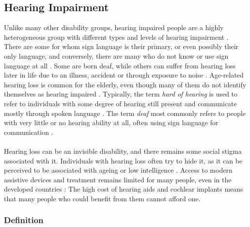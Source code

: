 \documentclass[english, 12pt, a4paper, pdftex, elec, utf8]{aaltothesis}
\begin{document}
\subsection{Hearing Impairment} \label{subsec:hear}

Unlike many other disability groups, hearing impaired people are a highly heterogeneous group with different types and levels of hearing impairment \cite{cavender2008hearing}. There are some for whom sign language is their primary, or even possibly their only language, and conversely, there are many who do not know or use sign language at all \cite{raino2012sisakorvaistutteen}. Some are born deaf, while others can suffer from hearing loss later in life due to an illness, accident or through exposure to noise \cite{moore2007cochlear}. Age-related hearing loss is common for the elderly, even though many of them do not identify themselves as hearing impaired \cite{salonen2013hearing}. Typically, the term \textit{hard of hearing} is used to refer to individuals with some degree of hearing still present and communicate mostly through spoken language \cite{deafness}. The term \textit{deaf} most commonly refers to people with very little or no hearing ability at all, often using sign language for communication \cite{deafness}. \\\\
Hearing loss can be an invisible disability, and there remains some social stigma associated with it. Individuals with hearing loss often try to hide it, as it can be perceived to be associated with ageing or low intelligence \cite{wilson2017global, salonen2013hearing}. Access to modern assistive devices and treatment remains limited for many people, even in the developed countries \cite{wilson2017global}: The high cost of hearing aids and cochlear implants means that many people who could benefit from them cannot afford one.

\subsubsection{Definition}
\end{document}
